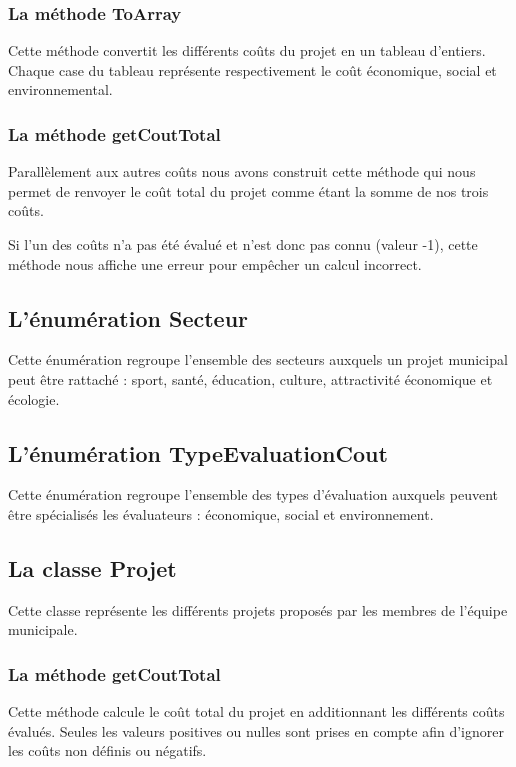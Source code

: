 \documentclass[11pt]{article}
\begin{document}
\subsubsection{La méthode ToArray}
Cette méthode convertit les différents coûts du projet en un tableau d’entiers. Chaque case du tableau représente respectivement le coût économique, social et environnemental.

\subsubsection{La méthode getCoutTotal}

Parallèlement aux autres coûts nous avons construit cette méthode qui nous permet de renvoyer le coût total du projet comme étant la somme de nos trois coûts. 

Si l’un des coûts n’a pas été évalué et n’est donc pas connu (valeur -1), cette méthode nous affiche une erreur pour empêcher un calcul incorrect.


\subsection{L’énumération Secteur}
Cette énumération regroupe l’ensemble des secteurs auxquels un projet municipal peut être rattaché : sport, santé, éducation, culture, attractivité économique et écologie.

\subsection{L’énumération TypeEvaluationCout}
Cette énumération regroupe l’ensemble des types d’évaluation auxquels peuvent être spécialisés les évaluateurs : économique, social et environnement.

\subsection{La classe Projet}

Cette classe représente les différents projets proposés par les membres de l’équipe municipale.

\subsubsection{La méthode getCoutTotal}
Cette méthode calcule le coût total du projet en additionnant les différents coûts évalués. Seules les valeurs positives ou nulles sont prises en compte afin d’ignorer les coûts non définis ou négatifs.
\end{document}
